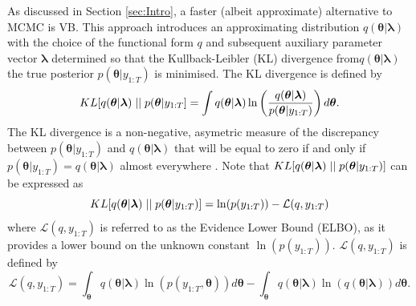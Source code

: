 \documentclass[12pt,a4paper]{article}%
\numberwithin{equation}{section}
\begin{document}
As discussed in Section \ref{sec:Intro}, a faster (albeit approximate) alternative to MCMC is VB. This approach introduces an approximating distribution $q(\boldsymbol{\theta} | \boldsymbol{\lambda})$ with the choice of the functional form $q$ and subsequent auxiliary parameter vector $\boldsymbol{\lambda}$ determined so that the Kullback-Leibler (KL) divergence \citep{Kullback1951} from$q(\boldsymbol{\theta} | \boldsymbol{\lambda})$ the true posterior $p(\boldsymbol{\theta} | y_{1:T})$ is minimised. The KL divergence is defined by
\begin{equation}
\label{KL-def}
KL[q(\boldsymbol{\theta} | \boldsymbol{\lambda})\hspace{.1cm}||\hspace{.1cm}p(\boldsymbol{\theta} | y_{1:T}] = \int q(\boldsymbol{\theta} | \boldsymbol{\lambda}) \ln \left( \frac{q(\boldsymbol{\theta} | \boldsymbol{\lambda})}{p(\boldsymbol{\theta} |y_{1:T})}\right) d\boldsymbol{\theta}.
\end{equation}
The KL divergence is a non-negative, asymetric measure of the discrepancy between $p(\boldsymbol{\theta} | y_{1:T})$ and $q(\boldsymbol{\theta} | \boldsymbol{\lambda})$  that will be equal to zero if and only if $p(\boldsymbol{\theta} | y_{1:T}) = q(\boldsymbol{\theta} | \boldsymbol{\lambda})$ almost everywhere \citep{Bishop2006}. Note that $KL[q(\boldsymbol{\theta} | \boldsymbol{\lambda})\hspace{.1cm}||\hspace{.1cm}p(\boldsymbol{\theta} | y_{1:T})]$ can be expressed as
\begin{equation}
\label{KL-ELBO}
KL[q(\boldsymbol{\theta} | \boldsymbol{\lambda})\hspace{.1cm}||\hspace{.1cm}p(\boldsymbol{\theta} | y_{1:T})] = \ln(p(y_{1:T})) - \mathcal{L}(q, y_{1:T})
\end{equation}
where $\mathcal{L}(q, y_{1:T})$ is referred to as the Evidence Lower Bound (ELBO), as it provides a lower bound on the unknown constant $\ln(p(y_{1:T}))$.  $\mathcal{L}(q, y_{1:T})$ is defined by
\begin{equation}
\label{ELBO}
\mathcal{L}(q, y_{1:T}) = \int_{\boldsymbol{\theta}} q(\boldsymbol{\theta} | \boldsymbol{\lambda}) \ln (p(y_{1:T},\boldsymbol{\theta})) d\boldsymbol{\theta} -  \int_{\boldsymbol{\theta}} q(\boldsymbol{\theta} | \boldsymbol{\lambda}) \ln (q(\boldsymbol{\theta} | \boldsymbol{\lambda})) d\boldsymbol{\theta}.
\end{equation}
\end{document}

